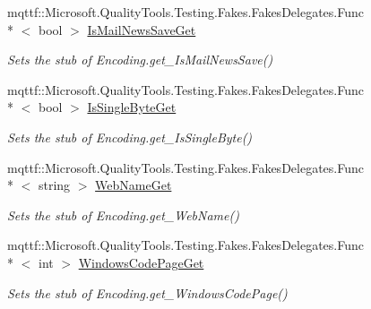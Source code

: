 \begin{DoxyCompactItemize}
mqttf\-::\-Microsoft.\-Quality\-Tools.\-Testing.\-Fakes.\-Fakes\-Delegates.\-Func\\*
$<$ bool $>$ \hyperlink{class_system_1_1_text_1_1_fakes_1_1_stub_u_t_f8_encoding_a47c792f3915ab31750ee1d93f89029f6}{Is\-Mail\-News\-Save\-Get}
\begin{DoxyCompactList}\small\item\em Sets the stub of Encoding.\-get\-\_\-\-Is\-Mail\-News\-Save()\end{DoxyCompactList}\item 
mqttf\-::\-Microsoft.\-Quality\-Tools.\-Testing.\-Fakes.\-Fakes\-Delegates.\-Func\\*
$<$ bool $>$ \hyperlink{class_system_1_1_text_1_1_fakes_1_1_stub_u_t_f8_encoding_a5dc2a6eab580cdc6946d2aa988a191e5}{Is\-Single\-Byte\-Get}
\begin{DoxyCompactList}\small\item\em Sets the stub of Encoding.\-get\-\_\-\-Is\-Single\-Byte()\end{DoxyCompactList}\item 
mqttf\-::\-Microsoft.\-Quality\-Tools.\-Testing.\-Fakes.\-Fakes\-Delegates.\-Func\\*
$<$ string $>$ \hyperlink{class_system_1_1_text_1_1_fakes_1_1_stub_u_t_f8_encoding_a3dbaf6f344e57e3cf819c6b23eda7727}{Web\-Name\-Get}
\begin{DoxyCompactList}\small\item\em Sets the stub of Encoding.\-get\-\_\-\-Web\-Name()\end{DoxyCompactList}\item 
mqttf\-::\-Microsoft.\-Quality\-Tools.\-Testing.\-Fakes.\-Fakes\-Delegates.\-Func\\*
$<$ int $>$ \hyperlink{class_system_1_1_text_1_1_fakes_1_1_stub_u_t_f8_encoding_ad959790f105d1b7f8d3db62fa0ab8e8f}{Windows\-Code\-Page\-Get}
\begin{DoxyCompactList}\small\item\em Sets the stub of Encoding.\-get\-\_\-\-Windows\-Code\-Page()\end{DoxyCompactList}\end{DoxyCompactItemize}

